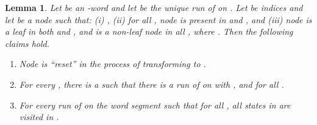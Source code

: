 \documentclass[3p]{elsarticle}
\newtheorem{lemma}[theorem]{Lemma}
\begin{document}
\begin{lemma}\label{claim1} Let  be an -word and 
let  be the unique run of  on .
Let  be indices and let  be a node such that: (i) ,
(ii) for all , node  is present in
 and , and (iii) node  is a leaf in
both  and , and is a non-leaf node in all , where .  Then the following claims hold.
 \begin{enumerate}
   \item \label{claim1a} Node  is ``reset'' in the process of
     transforming  to .
   \item \label{claim1b} For every , there is a
      such that there is a run  of  on
      with ,  and
      for all .
   \item \label{claim1c} For every run  of  on the word
     segment  such that 
     for all , all states in 
     are visited in .
 \end{enumerate}
\end{lemma}
\end{document}
